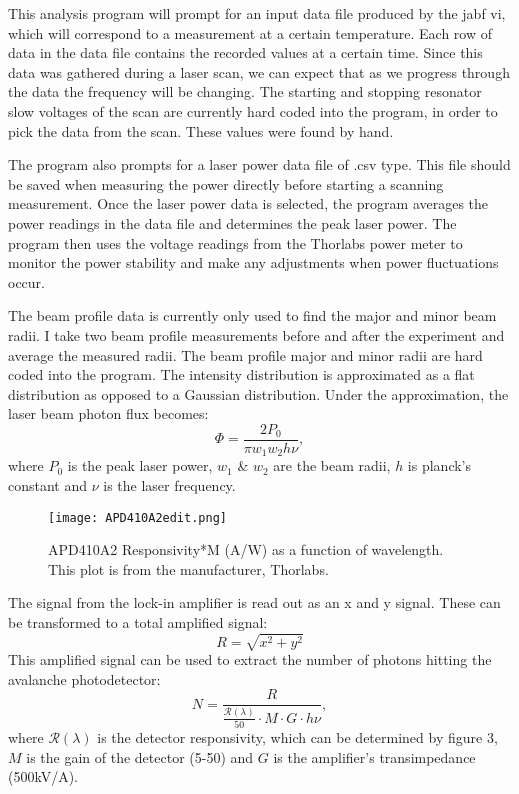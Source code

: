 \documentclass[12pt, a4paper]{article}
\begin{document}
This analysis program will prompt for an input data file produced by the jabf vi, which will correspond to a measurement at a certain temperature. Each row of data in the data file contains the recorded values at a certain time. Since this data was gathered during a laser scan, we can expect that as we progress through the data the frequency will be changing. The starting and stopping resonator slow voltages of the scan are currently hard coded into the program, in order to pick the data from the scan. These values were found by hand. 

The program also prompts for a laser power data file of .csv type. This file should be saved when measuring the power directly before starting a scanning measurement. Once the laser power data is selected, the program averages the power readings in the data file and determines the peak laser power. The program then uses the voltage readings from the Thorlabs power meter to monitor the power stability and make any adjustments when power fluctuations occur. 

The beam profile data is currently only used to find the major and minor beam radii. I take two beam profile measurements before and after the experiment and average the measured radii.  The beam profile major and minor radii are hard coded into the program. The intensity distribution is approximated as a flat distribution as opposed to a Gaussian distribution. Under the approximation, the laser beam photon flux becomes:
\begin{equation}
\Phi = \frac{2P_0}{\pi w_1 w_2 h \nu},
\end{equation}
where $P_0$ is the peak laser power, $w_1$ \& $w_2$ are the beam radii, $h$ is planck's constant and $\nu$ is the laser frequency.

\begin{wrapfigure}{r}{0.45\textwidth}
  \texttt{[image: APD410A2edit.png]}
  \vspace*{-3mm}
  \caption{APD410A2 Responsivity*M (A/W) as a function of wavelength. This plot is from the manufacturer, Thorlabs.}
\end{wrapfigure}

The signal from the lock-in amplifier is read out as an x and y signal. These can be transformed to a total amplified signal:
\begin{equation}
R = \sqrt{x^2+y^2}
\end{equation}
This amplified signal can be used to extract the number of photons hitting the avalanche photodetector:
\begin{equation}
N = \frac{R}{\frac{\mathcal{R}(\lambda)}{50}\cdot M\cdot G \cdot h\nu},
\end{equation}
where $\mathcal{R}(\lambda)$ is the detector responsivity, which can be determined by figure 3, $M$ is the gain of the detector (5-50) and $G$ is the amplifier's transimpedance (500kV/A).
\end{document}
